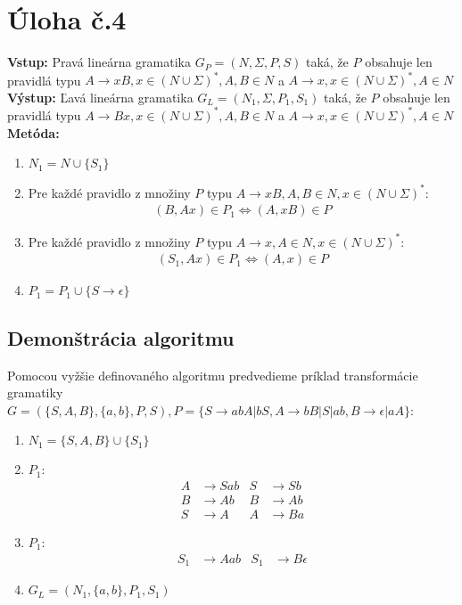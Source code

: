 \documentclass[10pt]{article}
\begin{document}
\section*{Úloha č.4}

\textbf{Vstup:} Pravá lineárna gramatika $G_P = (N, \Sigma, P, S)$ taká, že $P$ obsahuje len pravidlá typu
$A\to xB, x \in (N\cup\Sigma)^*, A,B \in N$ a $A\to x, x \in (N\cup\Sigma)^*, A \in N$\\
\textbf{Výstup:} Ľavá lineárna gramatika $G_L = (N_1, \Sigma, P_1, S_1)$ taká, že $P$ obsahuje len pravidlá typu
$A\to Bx, x \in (N\cup\Sigma)^*, A,B \in N$ a $A\to x, x \in (N\cup\Sigma)^*, A \in N$\\
\textbf{Metóda:}
\begin{enumerate}
    \item $N_1 = N \cup \{S_1\}$
    \item Pre každé pravidlo z množiny $P$ typu $A\to xB, A,B \in N, x \in (N\cup\Sigma)^*$:\\
        \begin{align*}
            (B,Ax) \in P_1 \iff (A, xB) \in P
        \end{align*}
    \item Pre každé pravidlo z množiny $P$ typu $A\to x, A \in N, x \in (N\cup\Sigma)^*$:\\
        \begin{align*}
            (S_1,Ax) \in P_1 \iff (A, x) \in P
        \end{align*}
    \item $P_1 = P_1 \cup \{S\to\epsilon\}$
\end{enumerate}

\subsection*{Demonštrácia algoritmu}
Pomocou vyžšie definovaného algoritmu predvedieme príklad transformácie gramatiky $G = (\{S,A,B\}, \{a, b\}, P, S),
P = \{S\to abA|bS, A\to bB|S|ab, B\to \epsilon | aA \}$:
\begin{enumerate}
    \item $N_1 = \{S, A, B\} \cup \{ S_1\}$
    \item $P_1$: 
            \begin{align*}
                A&\to Sab  & S&\to Sb\\
                B&\to Ab   & B&\to Ab\\
                S&\to A    & A&\to Ba
            \end{align*}
    \item $P_1$: 
            \begin{align*}
                S_1&\to Aab & S_1&\to B\epsilon
            \end{align*}
    \item $G_L = (N_1, \{a,b\}, P_1, S_1)$

\end{enumerate}
\end{document}
